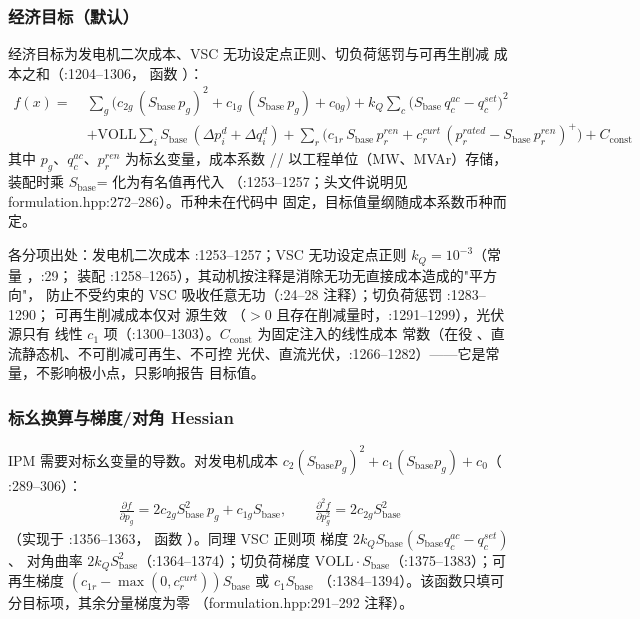\subsubsection*{经济目标（默认）}
经济目标为发电机二次成本、VSC 无功设定点正则、切负荷惩罚与可再生削减
成本之和（:1204--1306，
函数 ）：
\begin{align*}
f(x)=\;&\sum_{g}\Big(c_{2g}\,(S_{\mathrm{base}}\,p_g)^2
       +c_{1g}\,(S_{\mathrm{base}}\,p_g)+c_{0g}\Big)
 +k_{Q}\sum_{c}\Big(S_{\mathrm{base}}\,q^{ac}_c-q^{set}_c\Big)^2\\
 &+\mathrm{VOLL}\sum_{i}S_{\mathrm{base}}\,(\Delta p^d_i+\Delta q^d_i)
 +\sum_{r}\Big(c_{1r}\,S_{\mathrm{base}}\,p^{ren}_r
 +c^{curt}_r\,(p^{rated}_r-S_{\mathrm{base}}\,p^{ren}_r)^+\Big)
 +C_{\mathrm{const}}
\end{align*}
其中 $p_g$、$q^{ac}_c$、$p^{ren}_r$ 为标幺变量，成本系数
// 以工程单位（MW、MVAr）存储，
装配时乘 $S_{\mathrm{base}}$= 化为有名值再代入
（:1253--1257；头文件说明见 formulation.hpp:272--286）。币种未在代码中
固定，目标值量纲随成本系数币种而定。

各分项出处：发电机二次成本 :1253--1257；VSC 无功设定点正则
$k_{Q}=10^{-3}$（常量 ，:29；
装配 :1258--1265），其动机按注释是消除无功无直接成本造成的"平方向"，
防止不受约束的 VSC 吸收任意无功（:24--28 注释）；切负荷惩罚 :1283--1290；
可再生削减成本仅对  源生效
（$>0$ 且存在削减量时，:1291--1299），光伏源只有
线性 $c_1$ 项（:1300--1303）。$C_{\mathrm{const}}$ 为固定注入的线性成本
常数（在役 、直流静态机、不可削减可再生、不可控
光伏、直流光伏，:1266--1282）——它是常量，不影响极小点，只影响报告
目标值。

\subsubsection*{标幺换算与梯度/对角 Hessian}
IPM 需要对标幺变量的导数。对发电机成本
$c_2(S_{\mathrm{base}}p_g)^2+c_1(S_{\mathrm{base}}p_g)+c_0$（
:289--306）：
\begin{align*}
\frac{\partial f}{\partial p_g}
 =2c_{2g}S_{\mathrm{base}}^2\,p_g+c_{1g}S_{\mathrm{base}},\qquad
\frac{\partial^2 f}{\partial p_g^2}=2c_{2g}S_{\mathrm{base}}^2
\end{align*}
（实现于 :1356--1363，
函数 ）。同理 VSC 正则项
梯度 $2k_{Q}S_{\mathrm{base}}(S_{\mathrm{base}}q^{ac}_c-q^{set}_c)$、
对角曲率 $2k_{Q}S_{\mathrm{base}}^2$（:1364--1374）；切负荷梯度
$\mathrm{VOLL}\cdot S_{\mathrm{base}}$（:1375--1383）；可再生梯度
$(c_{1r}-\max(0,c^{curt}_r))S_{\mathrm{base}}$ 或 $c_1 S_{\mathrm{base}}$
（:1384--1394）。该函数只填可分目标项，其余分量梯度为零
（formulation.hpp:291--292 注释）。

